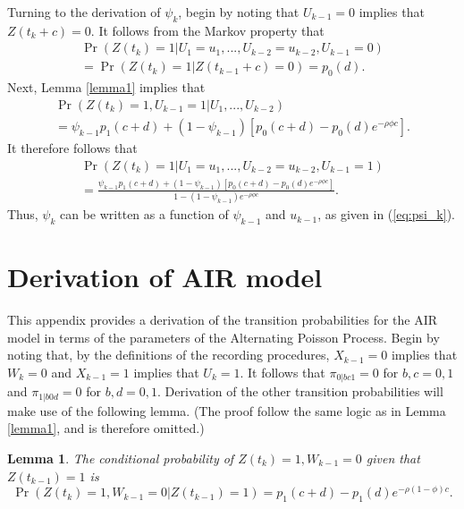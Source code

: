 \documentclass[man, noextraspace, floatsintext]{apa6}\usepackage[]{graphicx}\usepackage[]{color}
\newtheorem{lemma}{Lemma}
\begin{document}
Turning to the derivation of $\psi_k$, begin by noting that $U_{k-1} = 0$ implies that $Z(t_k + c) = 0$. 
It follows from the Markov property that 
\begin{multline*}
\Pr\left(Z(t_k) = 1 \left| U_1 = u_1,...,U_{k-2} = u_{k-2}, U_{k-1} = 0 \right.\right) \\ 
= \Pr\left(Z(t_k) = 1 \left| Z(t_{k-1} + c) = 0 \right.\right) = p_0(d).
\end{multline*}
Next, Lemma \ref{lemma1} implies that \begin{multline*}
\Pr\left(Z(t_k) = 1, U_{k-1} = 1 \left| U_1,...,U_{k-2} \right.\right) \\
= \psi_{k-1} p_1(c + d) + (1 - \psi_{k-1}) \left[p_0(c + d) - p_0(d) e^{-\rho \phi c}\right].
\end{multline*}
It therefore follows that 
\begin{multline*}
\Pr\left(Z(t_k) = 1 \left| U_1 = u_1,...,U_{k-2} = u_{k-2}, U_{k-1} = 1 \right.\right) \\
= \frac{\psi_{k-1} p_1(c + d) + (1 - \psi_{k-1}) \left[p_0(c + d) - p_0(d) e^{-\rho \phi c}\right]}{1 - (1 - \psi_{k-1})e^{-\rho \phi c}}.
\end{multline*}
Thus, $\psi_k$ can be written as a function of $\psi_{k-1}$ and $u_{k-1}$, as given in (\ref{eq:psi_k}).


\section{Derivation of AIR model}
\label{app:AIR_derivation}

This appendix provides a derivation of the transition probabilities for the AIR model in terms of the parameters of the Alternating Poisson Process. Begin by noting that, by the definitions of the recording procedures, $X_{k-1} = 0$ implies that $W_k = 0$ and $X_{k-1} = 1$ implies that $U_k = 1$. It follows that $\pi_{0|bc1} = 0$ for $b,c = 0,1$ and $\pi_{1|b0d} = 0$ for $b,d=0,1$. Derivation of the other transition probabilities will make use of the following lemma. (The proof follow the same logic as in Lemma \ref{lemma1}, and is therefore omitted.)

\begin{lemma}
\label{lemma2}
The conditional probability of $Z(t_k) = 1, W_{k-1} = 0$ given that $Z(t_{k-1}) = 1$ is
\[
\Pr\left(Z(t_k) = 1, W_{k-1} = 0 \left| Z(t_{k-1}) = 1 \right.\right) = p_1(c + d) - p_1(d) e^{-\rho (1 - \phi) c}. \]
\end{lemma}
\end{document}
